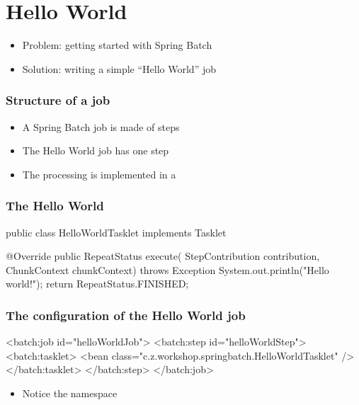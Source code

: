 \section{Hello World}

\begin{frame}
 \begin{itemize}
  \item Problem: getting started with Spring Batch
  \item Solution: writing a simple ``Hello World'' job
 \end{itemize}
\end{frame}

\begin{frame}
 \frametitle{Structure of a job}
 \begin{itemize}
  \item A Spring Batch job is made of steps
  \item The Hello World job has one step
  \item The processing is implemented in a 
 \end{itemize}
\end{frame}

\begin{frame}[fragile]
\frametitle{The Hello World }
\begin{javacode}
public class HelloWorldTasklet implements Tasklet {

  @Override
  public RepeatStatus execute(
      StepContribution contribution,
      ChunkContext chunkContext) throws Exception {
    System.out.println("Hello world!");
    return RepeatStatus.FINISHED;
  }

}
\end{javacode}
\end{frame}

\begin{frame}[fragile]
\frametitle{The configuration of the Hello World job}
\begin{xmlcode}
<batch:job id="helloWorldJob">
  <batch:step id="helloWorldStep">
    <batch:tasklet>
      <bean class="c.z.workshop.springbatch.HelloWorldTasklet" />
    </batch:tasklet>
  </batch:step>
</batch:job>
\end{xmlcode}

\begin{itemize}
 \item Notice the  namespace
\end{itemize}

\end{frame}

